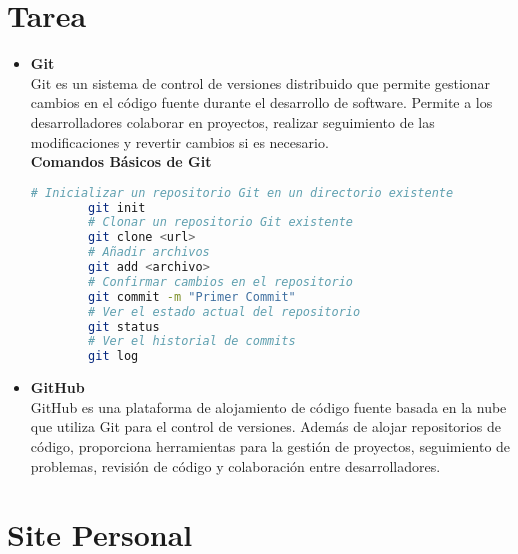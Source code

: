 \documentclass{article}
\begin{document}
\section{Tarea}
\begin{itemize}
	\item \textbf{Git}\\
        Git es un sistema de control de versiones distribuido que permite gestionar cambios en el código fuente durante el desarrollo de software. Permite a los desarrolladores colaborar en proyectos, realizar seguimiento de las modificaciones y revertir cambios si es necesario.\\
        \textbf{Comandos Básicos de Git}
        \begin{lstlisting}[language=bash]
        # Inicializar un repositorio Git en un directorio existente
        git init
        # Clonar un repositorio Git existente
        git clone <url>
        # Añadir archivos
        git add <archivo>
        # Confirmar cambios en el repositorio
        git commit -m "Primer Commit"
        # Ver el estado actual del repositorio
        git status
        # Ver el historial de commits
        git log
        \end{lstlisting}
	\item \textbf{GitHub}\\
        GitHub es una plataforma de alojamiento de código fuente basada en la nube que utiliza Git para el control de versiones. Además de alojar repositorios de código, proporciona herramientas para la gestión de proyectos, seguimiento de problemas, revisión de código y colaboración entre desarrolladores.
\end{itemize}
\pagebreak

\section{Site Personal}
\end{document}
